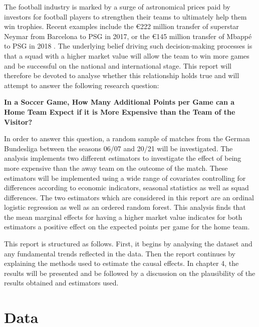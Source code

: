 \documentclass[11pt]{article}
\begin{document}
The football industry is marked by a surge of astronomical prices paid by investors for football players to strengthen their teams to ultimately help them win trophies.  Recent examples include the \euro{}222 million transfer of superstar Neymar from Barcelona to PSG in 2017,  or the \euro{}145 million transfer of Mbappé to PSG in 2018 \cite{transfer2021}. The underlying belief driving such decision-making processes is that a squad with a higher market value will allow the team to win more games and be successful on the national and international stage. This report will therefore be devoted to analyse whether this relationship holds true and will attempt to answer the following research question:

\begin{center}
	{\large \textbf{In a Soccer Game,  How Many Additional Points per Game can a Home Team Expect if it is More Expensive than the Team of the Visitor?}}
\end{center}

In order to answer this question, a random sample of matches from the German Bundesliga between the seasons 06/07 and 20/21 will be investigated. The analysis implements two different estimators to investigate the effect of being more expensive than the away team on the outcome of the match. These estimators will be implemented using a wide range of covariates controlling for differences according to economic indicators, seasonal statistics as well as squad differences. The two estimators which are considered in this report are an ordinal logistic regression as well as an ordered random forest. This analysis finds that the mean marginal effects for having a higher market value indicates for both estimators a positive effect on the expected points per game for the home team.

This report is structured as follows. First, it begins by analysing the dataset and any fundamental trends reflected in the data. Then the report continues by explaining the methods used to estimate the causal effects. In chapter 4, the results will be presented and be followed by a discussion on the plausibility of the results obtained and estimators used.


\section{Data}
\end{document}
